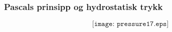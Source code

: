 \documentclass[aspectratio=169,xcolor=dvipsnames]{beamer}
\begin{document}
%
%
%
%
%
\begin{frame}
	\frametitle{Pascals prinsipp og hydrostatisk trykk}

	$$\texttt{[image: pressure17.eps]}$$
\end{frame}
%
%
%
\end{document}
